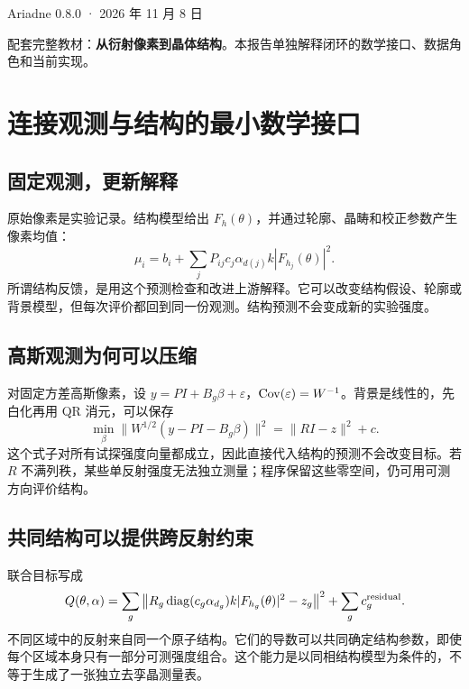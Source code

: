 \documentclass[11pt,oneside,openany]{book}
\begin{document}
\frontmatter
\begin{titlepage}
\vspace*{28mm}
\par
\vspace{15mm}
\par
\vspace{14mm}
\par
\vfill
\noindent Ariadne 0.8.0 · 2026 年 11 月 8 日\par
\vspace{5mm}
\noindent\small 配套完整教材：\textbf{从衍射像素到晶体结构}。本报告单独解释闭环的数学接口、数据角色和当前实现。
\end{titlepage}
\tableofcontents
\mainmatter
\chapter{连接观测与结构的最小数学接口}
\section{固定观测，更新解释}
原始像素是实验记录。结构模型给出 $F_h(\theta)$，并通过轮廓、晶畴和校正参数产生像素均值：
\begin{equation}
 \mu_i=b_i+\sum_jP_{ij}c_j\alpha_{d(j)}k|F_{h_j}(\theta)|^2.
\end{equation}
所谓结构反馈，是用这个预测检查和改进上游解释。它可以改变结构假设、轮廓或背景模型，但每次评价都回到同一份观测。结构预测不会变成新的实验强度。

\section{高斯观测为何可以压缩}
对固定方差高斯像素，设 $y=PI+B_g\beta+\varepsilon$，$\operatorname{Cov}(\varepsilon)=W^{-1}$。背景是线性的，先白化再用 QR 消元，可以保存
\begin{equation}
 \min_\beta\|W^{1/2}(y-PI-B_g\beta)\|^2=\|RI-z\|^2+c.
\end{equation}
这个式子对所有试探强度向量都成立，因此直接代入结构的预测不会改变目标。若 $R$ 不满列秩，某些单反射强度无法独立测量；程序保留这些零空间，仍可用可测方向评价结构。

\section{共同结构可以提供跨反射约束}
联合目标写成
\begin{equation}
 Q(\theta,\alpha)=\sum_g\left\|
 R_g\operatorname{diag}(c_g\alpha_{d_g})k|F_{h_g}(\theta)|^2-z_g
 \right\|^2+\sum_gc_g^{\rm residual}.
\end{equation}
不同区域中的反射来自同一个原子结构。它们的导数可以共同确定结构参数，即使每个区域本身只有一部分可测强度组合。这个能力是以同相结构模型为条件的，不等于生成了一张独立去孪晶测量表。
\end{document}
